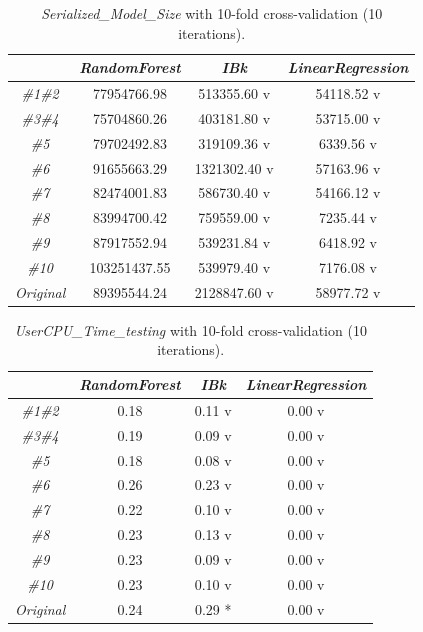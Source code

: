 \documentclass[journal,twoside,web]{ieeecolor}
\begin{document}
\begin{table}[h]
	\begin{center}
		\footnotesize{\begin{tabular}{cccc}\hline
				 & \textit{\textbf{RandomForest}} & \textit{\textbf{IBk}} & \textit{\textbf{LinearRegression
					}} \\\hline
					
\textit{\#1\#2} &   77954766.98 &     513355.60 v &   54118.52 v\\
\textit{\#3\#4} &   75704860.26 &     403181.80 v &   53715.00 v\\
\textit{\#5} &   79702492.83 &     319109.36 v &    6339.56 v\\
\textit{\#6} &   91655663.29 &    1321302.40 v &   57163.96 v\\
\textit{\#7} &   82474001.83 &     586730.40 v &   54166.12 v\\
\textit{\#8} &   83994700.42 &     759559.00 v  &   7235.44 v\\
\textit{\#9} &   87917552.94 &     539231.84 v  &   6418.92 v\\
\textit{\#10} &   103251437.55 &     539979.40 v &    7176.08 v\\
\textit{Original}  &  89395544.24 &    2128847.60 v &   58977.72 v\\
					\hline		
				\end{tabular}}
			\end{center}
			\caption{\textit{Serialized\_Model\_Size} with 10-fold cross-validation (10 iterations).}
			\label{SMSCV}
		\end{table}

\begin{table}[h]
	\begin{center}
		\footnotesize{\begin{tabular}{cccc}\hline
				& \textit{\textbf{RandomForest}} & \textit{\textbf{IBk}} & \textit{\textbf{LinearRegression
					}} \\\hline
					
\textit{\#1\#2} &   0.18 &   0.11 v &   0.00 v\\
\textit{\#3\#4} &   0.19&    0.09 v &   0.00 v\\
\textit{\#5} &   0.18 &   0.08 v &   0.00 v\\
\textit{\#6} &   0.26 &   0.23 v &   0.00 v\\
\textit{\#7}&   0.22 &   0.10 v &   0.00 v\\
\textit{\#8} &   0.23 &   0.13 v &   0.00 v\\
\textit{\#9} &   0.23 &    0.09 v &   0.00 v\\
\textit{\#10}&    0.23 &    0.10 v &   0.00 v\\
\textit{Original}  &  0.24 &   0.29 * &   0.00 v\\
					\hline		
				\end{tabular}}
			\end{center}
			\caption{\textit{UserCPU\_Time\_testing} with 10-fold cross-validation (10 iterations).}
			\label{RTCV}
		\end{table}
\end{document}
